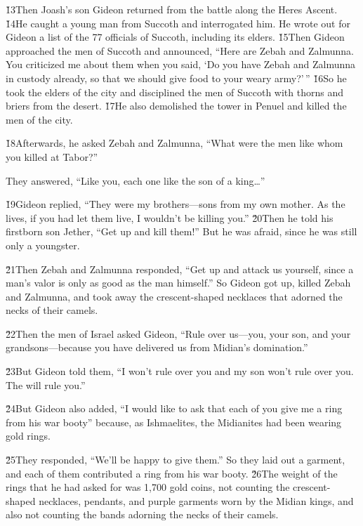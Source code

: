 \v{13}Then Joash's son Gideon returned from the battle along the Heres Ascent. \v{14}He caught a young man from Succoth and interrogated him. He wrote out for Gideon a list of the 77 officials of Succoth, including its elders. \v{15}Then Gideon approached the men of Succoth and announced, ``Here are Zebah and Zalmunna. You criticized me about them when you said, `Do you have Zebah and Zalmunna in custody already, so that we should give food to your weary army?'\,'' \v{16}So he took the elders of the city and disciplined the men of Succoth with thorns and briers from the desert. \v{17}He also demolished the tower in Penuel and killed the men of the city.

\v{18}Afterwards, he asked Zebah and Zalmunna, ``What were the men like whom you killed at Tabor?''

They answered, ``Like you, each one like the son of a king{\ldots}''

\v{19}Gideon replied, ``They were my brothers---sons from my own mother. As the  lives, if you had let them live, I wouldn't be killing you.'' \v{20}Then he told his firstborn son Jether, ``Get up and kill them!'' But he was afraid, since he was still only a youngster.

\v{21}Then Zebah and Zalmunna responded, ``Get up and attack us yourself, since a man's valor is only as good as the man himself.'' So Gideon got up, killed Zebah and Zalmunna, and took away the crescent-shaped necklaces that adorned the necks of their camels.

\v{22}Then the men of Israel asked Gideon, ``Rule over us---you, your son, and your grandsons---because you have delivered us from Midian's domination.''

\v{23}But Gideon told them, ``I won't rule over you and my son won't rule over you. The  will rule you.''

\v{24}But Gideon also added, ``I would like to ask that each of you give me a ring from his war booty'' because, as Ishmaelites, the Midianites had been wearing gold rings.

\v{25}They responded, ``We'll be happy to give them.'' So they laid out a garment, and each of them contributed a ring from his war booty. \v{26}The weight of the rings that he had asked for was 1,700 gold coins, not counting the crescent-shaped necklaces, pendants, and purple garments worn by the Midian kings, and also not counting the bands adorning the necks of their camels.

